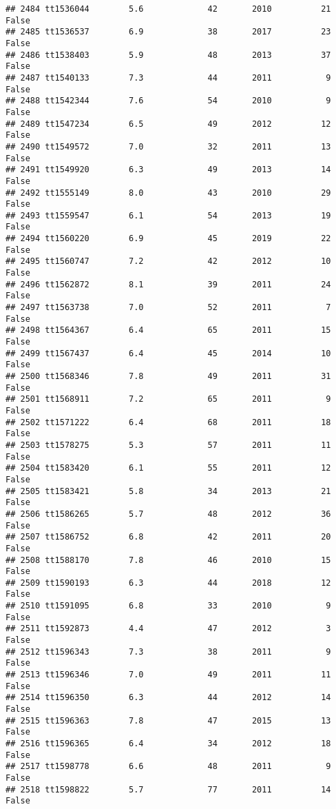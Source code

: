 \documentclass[
]{article}
\begin{document}
\begin{verbatim}
## 2484 tt1536044        5.6             42       2010          21   False
## 2485 tt1536537        6.9             38       2017          23   False
## 2486 tt1538403        5.9             48       2013          37   False
## 2487 tt1540133        7.3             44       2011           9   False
## 2488 tt1542344        7.6             54       2010           9   False
## 2489 tt1547234        6.5             49       2012          12   False
## 2490 tt1549572        7.0             32       2011          13   False
## 2491 tt1549920        6.3             49       2013          14   False
## 2492 tt1555149        8.0             43       2010          29   False
## 2493 tt1559547        6.1             54       2013          19   False
## 2494 tt1560220        6.9             45       2019          22   False
## 2495 tt1560747        7.2             42       2012          10   False
## 2496 tt1562872        8.1             39       2011          24   False
## 2497 tt1563738        7.0             52       2011           7   False
## 2498 tt1564367        6.4             65       2011          15   False
## 2499 tt1567437        6.4             45       2014          10   False
## 2500 tt1568346        7.8             49       2011          31   False
## 2501 tt1568911        7.2             65       2011           9   False
## 2502 tt1571222        6.4             68       2011          18   False
## 2503 tt1578275        5.3             57       2011          11   False
## 2504 tt1583420        6.1             55       2011          12   False
## 2505 tt1583421        5.8             34       2013          21   False
## 2506 tt1586265        5.7             48       2012          36   False
## 2507 tt1586752        6.8             42       2011          20   False
## 2508 tt1588170        7.8             46       2010          15   False
## 2509 tt1590193        6.3             44       2018          12   False
## 2510 tt1591095        6.8             33       2010           9   False
## 2511 tt1592873        4.4             47       2012           3   False
## 2512 tt1596343        7.3             38       2011           9   False
## 2513 tt1596346        7.0             49       2011          11   False
## 2514 tt1596350        6.3             44       2012          14   False
## 2515 tt1596363        7.8             47       2015          13   False
## 2516 tt1596365        6.4             34       2012          18   False
## 2517 tt1598778        6.6             48       2011           9   False
## 2518 tt1598822        5.7             77       2011          14   False

\end{verbatim}
\end{document}
